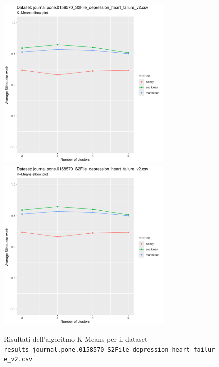 \documentclass[12pt]{report}
\begin{document}
			\begin{figure}[h]
				\centering
				\includegraphics[width = 0.75\textwidth, height = 0.45\textheight, page = 1]{
					results/results_journal.pone.0158570_S2File_depression_heart_failure_v2.csv.pdf
				}
				\includegraphics[width = 0.75\textwidth, height = 0.45\textheight, page = 2]{
					results/results_journal.pone.0158570_S2File_depression_heart_failure_v2.csv.pdf
				}
				\caption{Risultati dell'algoritmo K-Means per il dataset
				\texttt{results\_journal.pone.0158570\_S2File\_depression\_heart\_failure\_v2.csv}}
				\label{fig:kmeans1}
			\end{figure}
\end{document}
